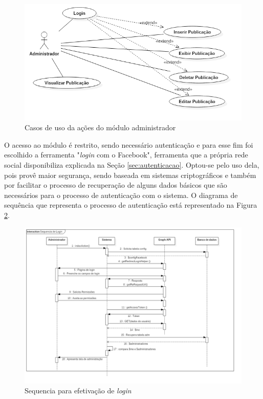 \begin{figure}[H]
\centering
\includegraphics[scale=0.4]{figuras/casosDeUsoADM}
\caption{Casos de uso da ações do módulo administrador}
\label{fig:casosDeUsoADM}
\end{figure}

O acesso ao módulo é restrito, sendo necessário autenticação e para esse fim foi escolhido a ferramenta "\textit{login} com o Facebook", ferramenta que a própria rede social disponibiliza explicada na Seção \ref{sec:autenticacao}. Optou-se pelo uso dela, pois provê maior segurança, sendo baseada em sistemas criptográficos e também por facilitar o processo de recuperação de alguns dados básicos que são necessários para o processo de autenticação com o sistema. O diagrama de sequência que representa o processo de autenticação está representado na Figura \ref{fig:sequencialogin}.

\begin{figure}[H]
\centering
\includegraphics[scale=0.3]{figuras/sequencialogin}
\caption{Sequencia para efetivação de \textit{login}}
\label{fig:sequencialogin}
\end{figure}

